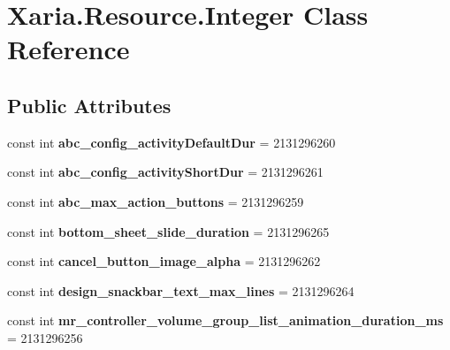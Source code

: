 \hypertarget{classXaria_1_1Resource_1_1Integer}{}\section{Xaria.\+Resource.\+Integer Class Reference}
\label{classXaria_1_1Resource_1_1Integer}
\subsection*{Public Attributes}
\begin{DoxyCompactItemize}
\item 
\mbox{\label{classXaria_1_1Resource_1_1Integer_a32ff54fd93df31465a1540aeb0e72bbe}} 
const int {\bfseries abc\+\_\+config\+\_\+activity\+Default\+Dur} = 2131296260
\item 
\mbox{\label{classXaria_1_1Resource_1_1Integer_a0aeace95f65ce951df8aa1f0af858451}} 
const int {\bfseries abc\+\_\+config\+\_\+activity\+Short\+Dur} = 2131296261
\item 
\mbox{\label{classXaria_1_1Resource_1_1Integer_a9983d6cce943eb0ef114073b576bb6dc}} 
const int {\bfseries abc\+\_\+max\+\_\+action\+\_\+buttons} = 2131296259
\item 
\mbox{\label{classXaria_1_1Resource_1_1Integer_afb7f0a8d75bf85319bb9d9490cbbd471}} 
const int {\bfseries bottom\+\_\+sheet\+\_\+slide\+\_\+duration} = 2131296265
\item 
\mbox{\label{classXaria_1_1Resource_1_1Integer_a56224f9b605e53319b26e8fbf4df8b4c}} 
const int {\bfseries cancel\+\_\+button\+\_\+image\+\_\+alpha} = 2131296262
\item 
\mbox{\label{classXaria_1_1Resource_1_1Integer_aaeb24e8846850132502266ee78f7d19c}} 
const int {\bfseries design\+\_\+snackbar\+\_\+text\+\_\+max\+\_\+lines} = 2131296264
\item 
\mbox{\label{classXaria_1_1Resource_1_1Integer_a88d30a1de8580a31e219763e16baa524}} 
const int {\bfseries mr\+\_\+controller\+\_\+volume\+\_\+group\+\_\+list\+\_\+animation\+\_\+duration\+\_\+ms} = 2131296256

\end{DoxyCompactItemize}

